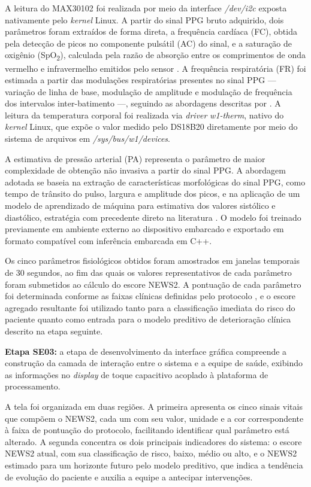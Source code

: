 A leitura do MAX30102 foi realizada por meio da interface \textit{/dev/i2c} exposta nativamente pelo \textit{kernel} Linux. A partir do sinal PPG bruto adquirido, dois parâmetros foram extraídos de forma direta, a frequência cardíaca (FC), obtida pela detecção de picos no componente pulsátil (AC) do sinal, e a saturação de oxigênio (SpO\textsubscript{2}), calculada pela razão de absorção entre os comprimentos de onda vermelho e infravermelho emitidos pelo sensor \cite{allen2007photoplethysmography}. A frequência respiratória (FR) foi estimada a partir das modulações respiratórias presentes no sinal PPG — variação de linha de base, modulação de amplitude e modulação de frequência dos intervalos inter-batimento —, seguindo as abordagens descritas por . A leitura da temperatura corporal foi realizada via \textit{driver} \textit{w1-therm}, nativo do \textit{kernel} Linux, que expõe o valor medido pelo DS18B20 diretamente por meio do sistema de arquivos em \textit{/sys/bus/w1/devices}.

A estimativa de pressão arterial (PA) representa o parâmetro de maior complexidade de obtenção não invasiva a partir do sinal PPG. A abordagem adotada se baseia na extração de características morfológicas do sinal PPG, como tempo de trânsito do pulso, largura e amplitude dos picos, e na aplicação de um modelo de aprendizado de máquina para estimativa dos valores sistólico e diastólico, estratégia com precedente direto na literatura \cite{sadeghi2025wearable}. O modelo foi treinado previamente em ambiente externo ao dispositivo embarcado e exportado em formato compatível com inferência embarcada em C++.

Os cinco parâmetros fisiológicos obtidos foram amostrados em janelas temporais de 30 segundos, ao fim das quais os valores representativos de cada parâmetro foram submetidos ao cálculo do escore NEWS2. A pontuação de cada parâmetro foi determinada conforme as faixas clínicas definidas pelo protocolo \cite{smith2013news}, e o escore agregado resultante foi utilizado tanto para a classificação imediata do risco do paciente quanto como entrada para o modelo preditivo de deterioração clínica descrito na etapa seguinte.

\textbf{Etapa SE03:} a etapa de desenvolvimento da interface gráfica compreende a construção da camada de interação entre o sistema e a equipe de saúde, exibindo as informações no \textit{display} de toque capacitivo acoplado à plataforma de processamento.

A tela foi organizada em duas regiões. A primeira apresenta os cinco sinais vitais que compõem o NEWS2, cada um com seu valor, unidade e a cor correspondente à faixa de pontuação do protocolo, facilitando identificar qual parâmetro está alterado. A segunda concentra os dois principais indicadores do sistema: o escore NEWS2 atual, com sua classificação de risco, baixo, médio ou alto, e o NEWS2 estimado para um horizonte futuro pelo modelo preditivo, que indica a tendência de evolução do paciente e auxilia a equipe a antecipar intervenções.

